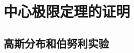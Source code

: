\documentclass[master]{thesis-uestc}
\begin{document}
\thesisappendix

\chapter{中心极限定理的证明}

\section{高斯分布和伯努利实验}




%
% 
%
% 
% 
%

\end{document}
